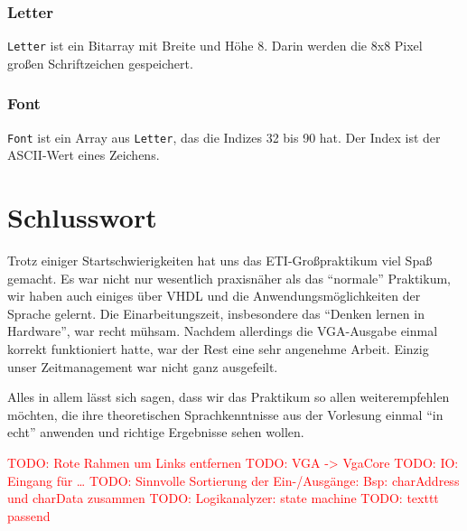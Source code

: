 \documentclass[IN,ngerman,utf8,12pt]{tumbook}
\newcommand\todo[1]{\textcolor{red}{TODO: #1}}
\begin{document}
\subsection{Letter}
\label{kap:letter}
\texttt{Letter} ist ein Bitarray mit Breite und Höhe 8.
Darin werden die 8x8 Pixel großen Schriftzeichen gespeichert.

\subsection{Font}
\label{kap:font}
\texttt{Font} ist ein Array aus \texttt{Letter}, das die Indizes 32 bis 90 hat.
Der Index ist der ASCII-Wert eines Zeichens.

\chapter{Schlusswort}
Trotz einiger Startschwierigkeiten hat uns das ETI-Großpraktikum viel Spaß gemacht. Es war nicht nur wesentlich praxisnäher als das ``normale'' Praktikum, wir haben auch einiges über VHDL und die Anwendungsmöglichkeiten der Sprache gelernt. Die Einarbeitungszeit, insbesondere das ``Denken lernen in Hardware'', war recht mühsam. Nachdem allerdings die VGA-Ausgabe einmal korrekt funktioniert hatte, war der Rest eine sehr angenehme Arbeit. Einzig unser Zeitmanagement war nicht ganz ausgefeilt.

Alles in allem lässt sich sagen, dass wir das Praktikum so allen weiterempfehlen möchten, die ihre theoretischen Sprachkenntnisse aus der Vorlesung einmal ``in echt'' anwenden und richtige Ergebnisse sehen wollen.

\todo{Rote Rahmen um Links entfernen}
\todo{VGA -> VgaCore}
\todo{IO: Eingang für \ldots}
\todo{Sinnvolle Sortierung der Ein-/Ausgänge: Bsp: charAddress und charData zusammen}
\todo{Logikanalyzer: state machine}
\todo{texttt passend}


\clearpage
\appendix%
\listoffigures%
\end{document}
